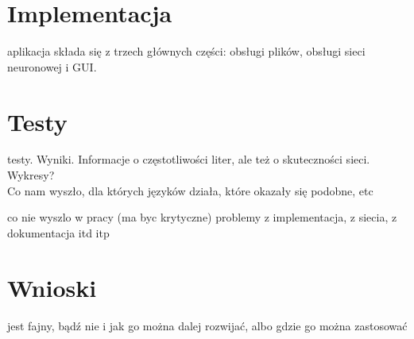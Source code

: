 \documentclass[journal]{IEEEtran}
\begin{document}
%




\section{Implementacja}
 aplikacja składa się z trzech głównych części: obsługi plików, obsługi sieci neuronowej i GUI.



\section{Testy}
 testy. Wyniki. Informacje o częstotliwości liter, ale też o skuteczności sieci. Wykresy? \\
Co nam wyszło, dla których języków działa, które okazały się podobne, etc

co nie wyszlo w pracy (ma byc krytyczne) problemy z implementacja, z siecia, z dokumentacja itd itp

\section{Wnioski}
 jest fajny, bądź nie i jak go można dalej rozwijać, albo gdzie go można zastosować
\end{document}
